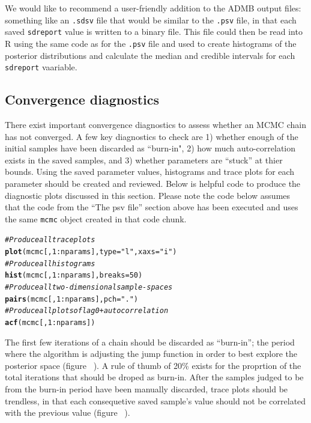 \documentclass{article}\usepackage[]{graphicx}\usepackage[]{color}
\makeatletter
\newcommand{\hlnum}[1]{\textcolor[rgb]{0.686,0.059,0.569}{#1}}%
\newcommand{\hlstr}[1]{\textcolor[rgb]{0.192,0.494,0.8}{#1}}%
\newcommand{\hlcom}[1]{\textcolor[rgb]{0.678,0.584,0.686}{\textit{#1}}}%
\newcommand{\hlopt}[1]{\textcolor[rgb]{0,0,0}{#1}}%
\newcommand{\hlstd}[1]{\textcolor[rgb]{0.345,0.345,0.345}{#1}}%
\newcommand{\hlkwc}[1]{\textcolor[rgb]{0.333,0.667,0.333}{#1}}%
\newcommand{\hlkwd}[1]{\textcolor[rgb]{0.737,0.353,0.396}{\textbf{#1}}}%
\newenvironment{kframe}{%
 \def\at@end@of@kframe{}%
 \ifinner\ifhmode%
  \def\at@end@of@kframe{\end{minipage}}%
  \begin{minipage}{\columnwidth}%
 \fi\fi%
 \def\FrameCommand##1{\hskip\@totalleftmargin \hskip-\fboxsep
 \colorbox{shadecolor}{##1}\hskip-\fboxsep
     \hskip-\linewidth \hskip-\@totalleftmargin \hskip\columnwidth}%
 \MakeFramed {\advance\hsize-\width
   \@totalleftmargin\z@ \linewidth\hsize
   \@setminipage}}%
 {\par\unskip\endMakeFramed%
 \at@end@of@kframe}
\newenvironment{knitrout}{}{} %
\makeatother
\begin{document}
We would like to recommend a user-friendly addition to the ADMB output files: 
something like an \texttt{.sdsv} file that would be similar to the \texttt{.psv} 
file, in that each saved \texttt{sdreport} value is written to a binary file. This 
file could then be read into R using the same code as for the \texttt{.psv} file 
and used to create histograms of the posterior distributions and calculate the 
median and credible intervals for each \texttt{sdreport} vaariable.

\subsection{Convergence diagnostics} \label{sec:diag}
There exist important convergence diagnostics to assess whether an MCMC chain has not
converged. A few key diagnostics to check are 1) whether enough of the initial samples 
have been discarded as ``burn-in", 2) how much auto-correlation exists in the saved 
samples, and 3) whether parameters are ``stuck'' at thier bounds. Using the saved 
parameter values, histograms and trace plots for each parameter should be created 
and reviewed. Below is helpful code to produce the diagnostic plots discussed in 
this section. Please note the code below assumes that the code from the ``The psv 
file'' section above has been executed and uses the same \texttt{mcmc} object 
created in that code chunk. 

\begin{knitrout}
\color{fgcolor}\begin{kframe}
\begin{alltt}
\hlcom{# Produce all trace plots}
\hlkwd{plot}\hlstd{(mcmc[,} \hlnum{1}\hlopt{:}\hlstd{nparams],} \hlkwc{type} \hlstd{=} \hlstr{"l"}\hlstd{,} \hlkwc{xaxs} \hlstd{=} \hlstr{"i"}\hlstd{)}
\hlcom{# Produce all histograms}
\hlkwd{hist}\hlstd{(mcmc[,} \hlnum{1}\hlopt{:}\hlstd{nparams],} \hlkwc{breaks} \hlstd{=} \hlnum{50}\hlstd{)}
\hlcom{# Produce all two-dimensional sample-spaces}
\hlkwd{pairs}\hlstd{(mcmc[,} \hlnum{1}\hlopt{:}\hlstd{nparams],} \hlkwc{pch} \hlstd{=} \hlstr{"."}\hlstd{)}
\hlcom{# Produce all plots of lag 0+ autocorrelation}
\hlkwd{acf}\hlstd{(mcmc[,} \hlnum{1}\hlopt{:}\hlstd{nparams])}
\end{alltt}
\end{kframe}
\end{knitrout}


The first few iterations of a chain should be discarded as ``burn-in''; the 
period where the algorithm is adjusting the jump function in order to best 
explore the posterior space (figure ~). A rule of thumb of 20\% exists for 
the proprtion of the total iterations that should be droped as burn-in. 
After the samples judged to be from the burn-in period have been manually 
discarded, trace plots should be trendless, in that each consequetive saved 
sample's value should not be correlated with the previous value (figure ~).
\end{document}
